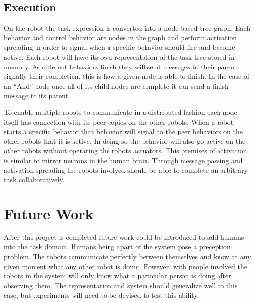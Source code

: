 \documentclass[conference]{IEEEtran}
\begin{document}
\subsection{Execution}
On the robot the task expression is converted into a node based tree graph. Each behavior and control behavior are nodes in the graph and perform activation spreading in order to signal when a specific behavior should fire and become active. Each robot will have its own representation of the task tree stored in memory. As different behaviors finish they will send messages to their parent signally their completion. this is how a given node is able to finish. In the case of an ``And'' node once all of its child nodes are complete it can send a finish message to its parent.

To enable multiple robots to communicate in a distributed fashion each node itself has connection with its peer copies on the other robots. When a robot starts a specific behavior that behavior will signal to the peer behaviors on the other robots that it is active. In doing so the behavior will also go active on the other robots without operating the robots actuators. This premises of activation is similar to mirror neurons in the human brain. Through message passing and activation spreading the robots involved should be able to complete an arbitrary task collaboratively.

\section{Future Work}
After this project is completed future work could be introduced to add humans into the task domain. Humans being apart of the system pose a preception problem. The robots communicate perfectly between themselves and know at any given moment what any other robot is doing. However, with people involved the robots in the system will only know what a particular person is doing after observing them. The representation and system should generalize well to this case, but experiments will need to be devised to test this ability.



\end{document}
